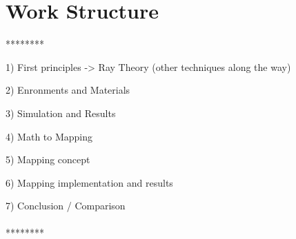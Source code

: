 \section{Work Structure}

********

1) First principles -> Ray Theory (other techniques along the way)

2) Enronments and Materials

3) Simulation and Results

4) Math to Mapping

5) Mapping concept

6) Mapping implementation and results

7) Conclusion / Comparison
\\\\
********